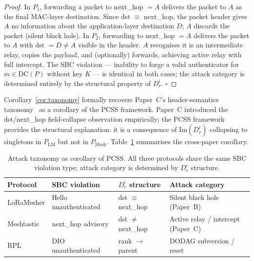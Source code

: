 \begin{proof}
In $P_{1}$, forwarding a packet to next\_hop $= A$ delivers the packet to
$A$ as the final MAC-layer destination.
Since dst $\equiv$ next\_hop, the packet header gives $A$ no information about
the application-layer destination $D$; $A$ discards the packet (silent black hole).
In $P_{2}$, forwarding to next\_hop $= A$ delivers the packet to $A$ with
dst $= D \neq A$ visible in the header.
$A$ recognises it is an intermediate relay, copies the payload, and
(optionally) forwards, achieving active relay with full intercept.
The SBC violation --- inability to forge a valid authenticator for
$m \in \mathrm{DC}(P)$ without key $K$ --- is identical in both cases;
the attack category is determined entirely by the structural property of $D_{r}^{i}$.
\hfill$\square$
\end{proof}

\begin{remark}
Corollary~\ref{cor:taxonomy} formally recovers Paper~C's header-semantics
taxonomy~\cite{paperC} as a corollary of the PCSS framework.
Paper~C introduced the dst/next\_hop field-collapse observation empirically;
the PCSS framework provides the structural explanation: it is a consequence of
$\mathrm{Im}(D_{r}^{i})$ collapsing to singletons in $P_{\mathrm{LM}}$ but not
in $P_{\mathrm{Mesh}}$.
Table~\ref{tab:taxonomy} summarises the cross-paper corollary.
\end{remark}

\begin{table}[t]
\centering
\caption{Attack taxonomy as corollary of PCSS.
  All three protocols share the same SBC violation type; attack category is
  determined by $D_{r}^{i}$ structure.}
\label{tab:taxonomy}
\begin{tabular}{llll}
\toprule
Protocol        & SBC violation         & $D_{r}^{i}$ structure & Attack category \\
\midrule
LoRaMesher      & Hello unauthenticated  & dst $\equiv$ next\_hop & Silent black hole (Paper~B) \\
Meshtastic      & next\_hop advisory     & dst $\neq$ next\_hop   & Active relay / intercept (Paper~C) \\
RPL             & DIO unauthenticated    & rank $\to$ parent      & DODAG subversion / reset \\
\bottomrule
\end{tabular}
\end{table}
